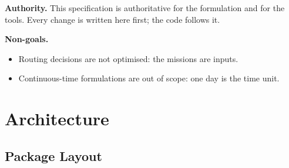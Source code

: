 \documentclass[11pt,a4paper]{article}
\theoremstyle{plain}
\theoremstyle{definition}
\renewcommand{\_}{\textunderscore\allowbreak{}}
\begin{document}
\textbf{Authority.} This specification is authoritative for the formulation and for
the tools. Every change is written here first; the code follows it.

\textbf{Non-goals.}
\begin{itemize}[nosep,leftmargin=1.5em]
  \item Routing decisions are not optimised: the missions are inputs.
  \item Continuous-time formulations are out of scope: one day is the time unit.
\end{itemize}

\section{Architecture}
\label{sec:files}

\subsection{Package Layout}
\end{document}
